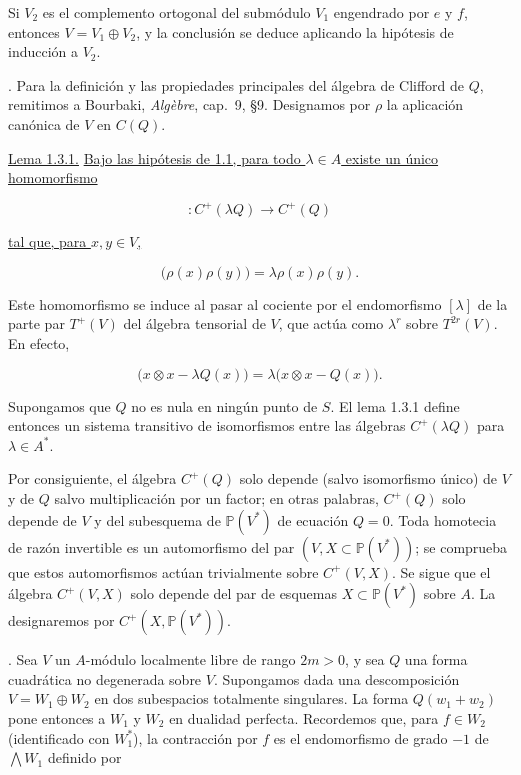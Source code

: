 Si $V_2$ es el complemento ortogonal del submódulo $V_1$ engendrado por
$e$ y $f$, entonces $V=V_1\oplus V_2$, y la conclusión se deduce aplicando
la hipótesis de inducción a $V_2$.

\medskip
{}. Para la definición y las propiedades principales del
álgebra de Clifford de $Q$, remitimos a Bourbaki, \emph{Algèbre}, cap.~9,
§9. Designamos por $\rho$ la aplicación canónica de $V$ en $C(Q)$.

\medskip
\noindent\underline{Lema 1.3.1.}\quad
\underline{Bajo las hipótesis de 1.1, para todo $\lambda\in A$ existe un
único homomorfismo}

\begin{equation*}
[\lambda]\colon C^+(\lambda Q)\longrightarrow C^+(Q)
\end{equation*}

\underline{tal que, para $x,y\in V$,}

\begin{equation*}
[\lambda]\bigl(\rho(x)\rho(y)\bigr)
=\lambda\rho(x)\rho(y).
\end{equation*}

\pageoriginale

Este homomorfismo se induce al pasar al cociente por el endomorfismo
$[\lambda]$ de la parte par $T^+(V)$ del álgebra tensorial de $V$, que
actúa como $\lambda^r$ sobre $T^{2r}(V)$. En efecto,

\begin{equation*}
[\lambda]\bigl(x\otimes x-\lambda Q(x)\bigr)
=\lambda\bigl(x\otimes x-Q(x)\bigr).
\end{equation*}

Supongamos que $Q$ no es nula en ningún punto de $S$. El lema 1.3.1 define
entonces un sistema transitivo de isomorfismos entre las álgebras
$C^+(\lambda Q)$ para $\lambda\in A^*$.

Por consiguiente, el álgebra $C^+(Q)$ solo depende (salvo isomorfismo
único) de $V$ y de $Q$ salvo multiplicación por un factor; en otras
palabras, $C^+(Q)$ solo depende de $V$ y del subesquema de
$\mathbb P(V^*)$ de ecuación $Q=0$. Toda homotecia de razón invertible es
un automorfismo del par $(V,X\subset\mathbb P(V^*))$; se comprueba que estos
automorfismos actúan trivialmente sobre $C^+(V,X)$. Se sigue que el álgebra
$C^+(V,X)$ solo depende del par de esquemas
$X\subset\mathbb P(V^*)$ sobre $A$. La designaremos por
$C^+(X,\mathbb P(V^*))$.

\medskip
{}. Sea $V$ un $A$-módulo localmente libre de rango $2m>0$, y
sea $Q$ una forma cuadrática no degenerada sobre $V$. Supongamos dada una
descomposición $V=W_1\oplus W_2$ en dos subespacios totalmente singulares.
La forma $Q(w_1+w_2)$ pone entonces a $W_1$ y $W_2$ en dualidad perfecta.
Recordemos que, para $f\in W_2$ (identificado con $W_1^*$), la contracción
por $f$ es el endomorfismo de grado $-1$ de $\bigwedge W_1$ definido por

